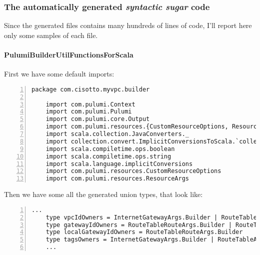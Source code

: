 \subsubsection{The automatically generated \textit{syntactic sugar} code}
Since the generated files contains many hundreds of lines of code, I'll report here only some samples of each file.\\

\paragraph{PulumiBuilderUtilFunctionsForScala}
First we have some default imports:\\
\begin{minipage}{\linewidth}
  \begin{lstlisting}[numbers=left, numberstyle=\tiny, numbersep=-5pt, stepnumber=1]
    package com.cisotto.myvpc.builder

    import com.pulumi.Context
    import com.pulumi.Pulumi
    import com.pulumi.core.Output
    import com.pulumi.resources.{CustomResourceOptions, Resource}
    import scala.collection.JavaConverters._
    import collection.convert.ImplicitConversionsToScala.`collection AsScalaIterable`
    import scala.compiletime.ops.boolean
    import scala.compiletime.ops.string
    import scala.language.implicitConversions
    import com.pulumi.resources.CustomResourceOptions
    import com.pulumi.resources.ResourceArgs
  \end{lstlisting}
 \end{minipage}
Then we have some all the generated union types, that look like:\\
\begin{minipage}{\linewidth}
  \begin{lstlisting}[numbers=left, numberstyle=\tiny, numbersep=-5pt, stepnumber=1]
    ...
    type vpcIdOwners = InternetGatewayArgs.Builder | RouteTableArgs.Builder | SubnetArgs.Builder
    type gatewayIdOwners = RouteTableRouteArgs.Builder | RouteTableAssociationArgs.Builder
    type localGatewayIdOwners = RouteTableRouteArgs.Builder
    type tagsOwners = InternetGatewayArgs.Builder | RouteTableArgs.Builder | ubnetArgs.Builder | VpcArgs.Builder
    ...
  \end{lstlisting}
 \end{minipage}

